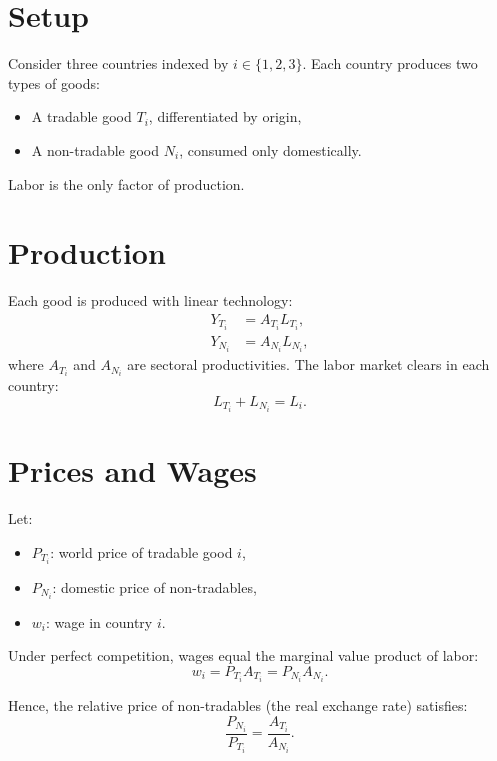 \documentclass[11pt]{article}
\begin{document}
\section{Setup}

Consider three countries indexed by \( i \in \{1,2,3\} \).  
Each country produces two types of goods:
\begin{itemize}
    \item A tradable good \( T_i \), differentiated by origin,
    \item A non-tradable good \( N_i \), consumed only domestically.
\end{itemize}

Labor is the only factor of production.

\section{Production}

Each good is produced with linear technology:
\begin{align}
Y_{T_i} &= A_{T_i} L_{T_i}, \\
Y_{N_i} &= A_{N_i} L_{N_i},
\end{align}
where \( A_{T_i} \) and \( A_{N_i} \) are sectoral productivities.  
The labor market clears in each country:
\begin{equation}
L_{T_i} + L_{N_i} = L_i.
\end{equation}

\section{Prices and Wages}

Let:
\begin{itemize}
    \item \( P_{T_i} \): world price of tradable good \( i \),
    \item \( P_{N_i} \): domestic price of non-tradables,
    \item \( w_i \): wage in country \( i \).
\end{itemize}

Under perfect competition, wages equal the marginal value product of labor:
\begin{equation}
w_i = P_{T_i} A_{T_i} = P_{N_i} A_{N_i}.
\end{equation}

Hence, the relative price of non-tradables (the real exchange rate) satisfies:
\begin{equation}
\frac{P_{N_i}}{P_{T_i}} = \frac{A_{T_i}}{A_{N_i}}.
\end{equation}
\end{document}
